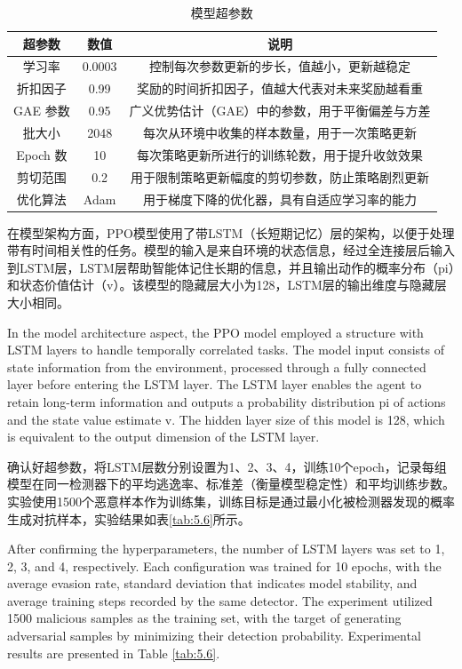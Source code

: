\begin{table}[htbp]
	\centering
	\caption{模型超参数}
	\label{tab:5.5}
    \begin{tabular*}{0.9\textwidth}{@{\extracolsep{\fill}}ccc}
    \toprule
		超参数 & 数值 & 说明 \\
    \midrule
		学习率 & 0.0003 & 控制每次参数更新的步长，值越小，更新越稳定 \\
		折扣因子 & 0.99 & 奖励的时间折扣因子，值越大代表对未来奖励越看重 \\
		GAE 参数 & 0.95 & 广义优势估计（GAE）中的参数，用于平衡偏差与方差 \\
		批大小 & 2048 & 每次从环境中收集的样本数量，用于一次策略更新 \\
		Epoch 数 & 10 & 每次策略更新所进行的训练轮数，用于提升收敛效果 \\
		剪切范围 & 0.2 & 用于限制策略更新幅度的剪切参数，防止策略剧烈更新\\
		优化算法 & Adam & 用于梯度下降的优化器，具有自适应学习率的能力 \\
    \bottomrule
	\end{tabular*}
\end{table}

在模型架构方面，PPO模型使用了带LSTM（长短期记忆）层的架构，以便于处理带有时间相关性的任务。模型的输入是来自环境的状态信息，经过全连接层后输入到LSTM层，LSTM层帮助智能体记住长期的信息，并且输出动作的概率分布（pi）和状态价值估计（v）。该模型的隐藏层大小为128，LSTM层的输出维度与隐藏层大小相同。

In the model architecture aspect, the PPO model employed a structure with LSTM layers to handle temporally correlated tasks. The model input consists of state information from the environment, processed through a fully connected layer before entering the LSTM layer. The LSTM layer enables the agent to retain long-term information and outputs a probability distribution pi of actions and the state value estimate v. The hidden layer size of this model is 128, which is equivalent to the output dimension of the LSTM layer.

确认好超参数，将LSTM层数分别设置为1、2、3、4，训练10个epoch，记录每组模型在同一检测器下的平均逃逸率、标准差（衡量模型稳定性）和平均训练步数。实验使用1500个恶意样本作为训练集，训练目标是通过最小化被检测器发现的概率生成对抗样本，实验结果如表\ref{tab:5.6}所示。

After confirming the hyperparameters, the number of LSTM layers was set to 1, 2, 3, and 4, respectively. Each configuration was trained for 10 epochs, with the average evasion rate, standard deviation that indicates model stability, and average training steps recorded by the same detector. The experiment utilized 1500 malicious samples as the training set, with the target of generating adversarial samples by minimizing their detection probability. Experimental results are presented in Table \ref{tab:5.6}.  

